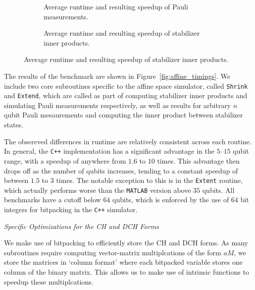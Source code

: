 \begin{figure}[p]\ContinuedFloat
\begin{subfigure}[t]{0.9\textwidth}
    \begin{scaletikzpicturetowidth}{\textwidth}
        
    \end{scaletikzpicturetowidth}
    \caption{Average runtime and resulting speedup of Pauli measurements.}
\end{subfigure}
\begin{subfigure}[t]{0.9\textwidth}
    \caption{Average runtime and resulting speedup of stabilizer inner products.}
    \begin{scaletikzpicturetowidth}{\textwidth}
        
    \end{scaletikzpicturetowidth}
\end{subfigure}
\end{figure}
The results of the benchmark are shown in Figure~\ref{fig:affine_timings}. We include two core subroutines specific to the affine space simulator, called \texttt{Shrink} and \texttt{Extend}, which are called as part of computing stabilizer inner products and simulating Pauli measurements respectively, as well as results for arbitrary $n$ qubit Pauli mesaurements and computing the inner product between stabilizer states.\par
The obsereved differences in runtime are relatively consistent across each routine. In general, the \texttt{C++} implementation has a significant advantage in the $5$--$15$ qubit range, with a speedup of anywhere from $1.6$ to $10$ times. This advantage then drops off as the number of qubits increases, tending to a constant speedup of between $1.5$ to $3$ times. The notable exception to this is in the \texttt{Extent} routine, which actually performs worse than the \texttt{MATLAB} version above $35$ qubits. All benchmarks have a cutoff below $64$ qubits, which is enforced by the use of $64$ bit integers for bitpacking in the \texttt{C++} simulator.
\par
\large{\itshape{Specific Optimizations for the CH and DCH Forms}}\par
We make use of bitpacking to efficiently store the CH and DCH forms. As many subroutines require computing vector-matrix multiplcations of the form $aM$, we store the matrices in `column format' where each bitpacked variable stores one column of the binary matrix. This allows us to make use of intrinsic functions to speedup these multiplcations.\par
